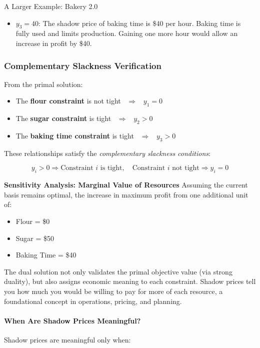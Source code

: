 \begin{example}{A Larger Example: Bakery 2.0}{}
\begin{itemize}
\item $y_3 = 40$: The shadow price of baking time is \$40 per hour.
Baking time is fully used and limits production. Gaining one more hour would allow an increase in profit by \$40.
\end{itemize}

\vspace{1em}
\subsubsection*{Complementary Slackness Verification}

From the primal solution:
\begin{itemize}
\item The \textbf{flour constraint} is not tight \ $\Rightarrow$ \  $y_1 = 0$
\item The \textbf{sugar constraint} is tight \ $\Rightarrow$ \ $y_2 > 0$
\item The \textbf{baking time constraint} is tight \ $\Rightarrow$ \ $y_3 > 0$
\end{itemize}

These relationships satisfy the \emph{complementary slackness conditions}:

$$
y_i > 0 \Rightarrow \text{Constraint } i \text{ is tight}, \quad
\text{Constraint } i \text{ not tight} \Rightarrow y_i = 0
$$

\vspace{1em}
\textbf{Sensitivity Analysis: Marginal Value of Resources}
Assuming the current basis remains optimal, the increase in maximum profit from one additional unit of:
\begin{itemize}
\item Flour = \$0
\item Sugar = \$50
\item Baking Time = \$40
\end{itemize}

\vspace{1em}

The dual solution not only validates the primal objective value (via strong duality), but also assigns economic meaning to each constraint. Shadow prices tell you how much you would be willing to pay for more of each resource, a foundational concept in operations, pricing, and planning.

\paragraph{When Are Shadow Prices Meaningful?}
Shadow prices are meaningful only when:


\end{example}
